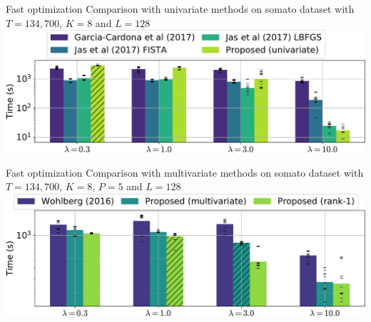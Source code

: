 \documentclass{beamer}
\begin{document}
\appendix


\begin{frame}{Fast optimization}
Comparison with univariate methods on somato dataset with $T=134,700$, $K=8$ and $L=128$\\[1em]
\includegraphics[width=\textwidth]{all_last_0001_T_13470_P1_K8_L128}
\end{frame}

\begin{frame}{Fast optimization}
Comparison with multivariate methods on somato dataset with $T=134,700$, $K=8$, $P=5$ and $L=128$\\[1em]
\includegraphics[width=\textwidth]{all_last_0001_T_13470_P5_K8_L128}
\end{frame}
\end{document}
